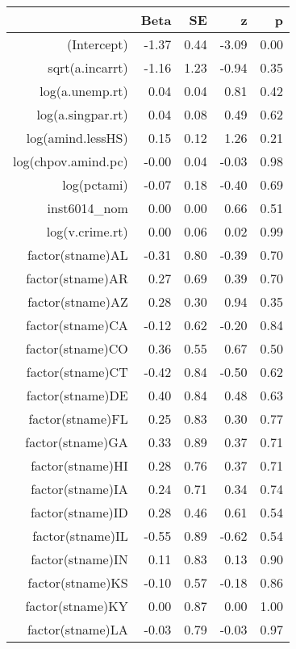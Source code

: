 \begin{table}[ht]
\centering
\begin{tabular}{rrrrr}
  \hline
 & Beta & SE & z & p \\ 
  \hline
(Intercept) & -1.37 & 0.44 & -3.09 & 0.00 \\ 
  sqrt(a.incarrt) & -1.16 & 1.23 & -0.94 & 0.35 \\ 
  log(a.unemp.rt) & 0.04 & 0.04 & 0.81 & 0.42 \\ 
  log(a.singpar.rt) & 0.04 & 0.08 & 0.49 & 0.62 \\ 
  log(amind.lessHS) & 0.15 & 0.12 & 1.26 & 0.21 \\ 
  log(chpov.amind.pc) & -0.00 & 0.04 & -0.03 & 0.98 \\ 
  log(pctami) & -0.07 & 0.18 & -0.40 & 0.69 \\ 
  inst6014\_nom & 0.00 & 0.00 & 0.66 & 0.51 \\ 
  log(v.crime.rt) & 0.00 & 0.06 & 0.02 & 0.99 \\ 
  factor(stname)AL & -0.31 & 0.80 & -0.39 & 0.70 \\ 
  factor(stname)AR & 0.27 & 0.69 & 0.39 & 0.70 \\ 
  factor(stname)AZ & 0.28 & 0.30 & 0.94 & 0.35 \\ 
  factor(stname)CA & -0.12 & 0.62 & -0.20 & 0.84 \\ 
  factor(stname)CO & 0.36 & 0.55 & 0.67 & 0.50 \\ 
  factor(stname)CT & -0.42 & 0.84 & -0.50 & 0.62 \\ 
  factor(stname)DE & 0.40 & 0.84 & 0.48 & 0.63 \\ 
  factor(stname)FL & 0.25 & 0.83 & 0.30 & 0.77 \\ 
  factor(stname)GA & 0.33 & 0.89 & 0.37 & 0.71 \\ 
  factor(stname)HI & 0.28 & 0.76 & 0.37 & 0.71 \\ 
  factor(stname)IA & 0.24 & 0.71 & 0.34 & 0.74 \\ 
  factor(stname)ID & 0.28 & 0.46 & 0.61 & 0.54 \\ 
  factor(stname)IL & -0.55 & 0.89 & -0.62 & 0.54 \\ 
  factor(stname)IN & 0.11 & 0.83 & 0.13 & 0.90 \\ 
  factor(stname)KS & -0.10 & 0.57 & -0.18 & 0.86 \\ 
  factor(stname)KY & 0.00 & 0.87 & 0.00 & 1.00 \\ 
  factor(stname)LA & -0.03 & 0.79 & -0.03 & 0.97 \\ 

\end{tabular}
\end{table}
